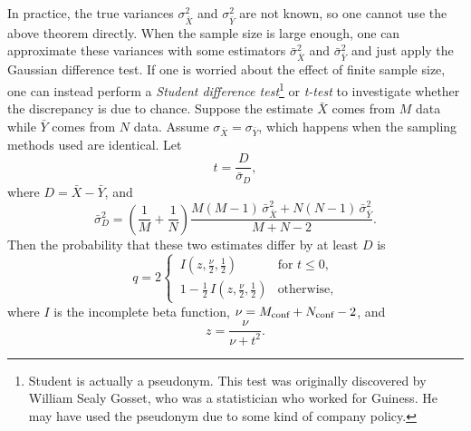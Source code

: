In practice, the true variances $\sigma_{\bar{X}}^2$ and $\sigma_{\bar{Y}}^2$
are not known, so one cannot use the above theorem directly.
When the sample size is large enough, one can approximate
these variances with some estimators $\bar{\sigma}_{\bar{X}}^2$ and
$\bar{\sigma}_{\bar{Y}}^2$ and just apply the Gaussian difference test.
If one is worried about the effect of finite sample size, 
one can instead perform a {\it Student
difference test}\footnote{Student is actually a pseudonym. This test was
originally discovered by William Sealy Gosset, who was a statistician who worked
for Guiness. He may have used the pseudonym due to some kind of company policy.} 
or {\it t-test} to investigate whether the 
discrepancy is due to chance. Suppose the estimate $\bar{X}$ comes from 
$M$ data while $\bar{Y}$ comes from $N$ data.
Assume $\sigma_{\bar{X}}=\sigma_{\bar{Y}}$, which
happens when the sampling methods used are identical.
Let
\begin{equation}
  t=\frac{D}{\bar{\sigma}_D},
\end{equation}
where $D=\bar{X}-\bar{Y}$, and
\begin{equation}
  \bar{\sigma}^2_D=\left(\frac{1}{M}+\frac{1}{N}\right)
                   \frac{M(M-1)\,\bar{\sigma}_{\bar{X}}^2
                    +N(N-1)\,\bar{\sigma}_{\bar{Y}}^2}
                   {M+N-2}.
\end{equation}
Then the probability that these two estimates differ by at least $D$ is
\begin{equation}
 q=2
 \begin{cases}
 \,I\left(z,\frac{\nu}{2},\frac{1}{2}\right) & \text{for }t\leq 0, \\
 \,1-\frac{1}{2}\,I\left(z,\frac{\nu}{2},\frac{1}{2}\right) & \text{otherwise},
 \end{cases}
\end{equation}
where $I$ is the incomplete beta function, $\nu=M_{\text{conf}}+N_{\text{conf}}-2$,
and
\begin{equation}
  z=\frac{\nu}{\nu+t^2}.
\end{equation}



